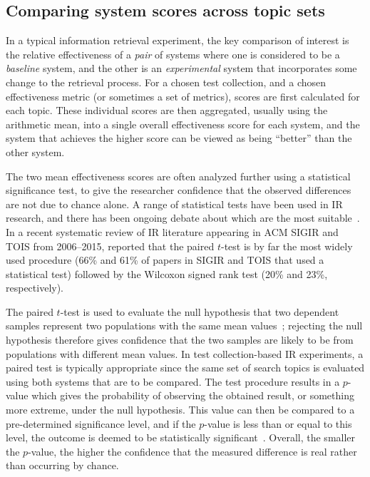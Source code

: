 \subsection{Comparing system scores across topic sets}
\label{sec-comparing-system-scores-across-topics}

In a typical information retrieval experiment, the key comparison of
interest is the relative effectiveness of a {\emph{pair}} of systems
where one is considered to be a {\emph{baseline}} system, and the
other is an {\emph{experimental}} system that incorporates some
change to the retrieval process.
For a chosen test collection, and a chosen effectiveness metric (or
sometimes a set of metrics), scores are first calculated for each
topic.
These individual scores are then aggregated, usually using the
arithmetic mean, into a single overall effectiveness score for each
system, and the system that achieves the higher score can be viewed
as being ``better'' than the other system.

The two mean effectiveness scores are often analyzed further using a
statistical significance test, to give the researcher confidence that
the observed differences are not due to chance alone.
A range of statistical tests have been used in IR research, and there
has been ongoing debate about which are the most
suitable~\citep{smucker07sigir}.
In a recent systematic review of IR literature appearing in ACM SIGIR
and TOIS from 2006--2015, {\citet{sakai17sigir}} reported that the
paired $t$-test is by far the most widely used procedure (66\% and 61\%
of papers in SIGIR and TOIS that used a statistical test) followed by
the Wilcoxon signed rank test (20\% and 23\%, respectively).

The paired $t$-test is used to evaluate the null hypothesis that two
dependent samples represent two populations with the same mean
values~\citep{sheskin97book}; rejecting the null hypothesis therefore
gives confidence that the two samples are likely to be from populations
with different mean values.
In test collection-based IR experiments, a paired test is typically
appropriate since the same set of search topics is evaluated using both
systems that are to be compared.
The test procedure results in a $p$-value which gives the probability
of observing the obtained result, or something more extreme, under the
null hypothesis.
This value can then be compared to a pre-determined significance
level, and if the $p$-value is less than or equal to this level, the
outcome is deemed to be statistically significant~\citep{sakai17sigir}.
Overall, the smaller the $p$-value, the higher the confidence that the
measured difference is real rather than occurring by chance.


